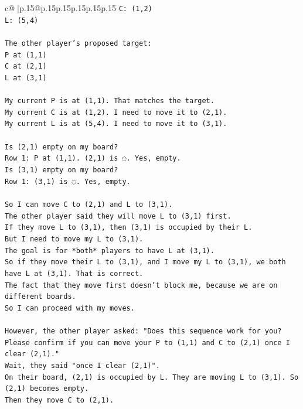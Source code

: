 \documentclass{article}
\begin{document}
{\begin{supertabular}{c@{$\;$}|p{.15\linewidth}@{}p{.15\linewidth}p{.15\linewidth}p{.15\linewidth}p{.15\linewidth}p{.15\linewidth}}
{{{\texttt{C: (1,2)} \\
\texttt{L: (5,4)} \\
\\ 
\texttt{The other player's proposed target:} \\
\texttt{P at (1,1)} \\
\texttt{C at (2,1)} \\
\texttt{L at (3,1)} \\
\\ 
\texttt{My current P is at (1,1). That matches the target.} \\
\texttt{My current C is at (1,2). I need to move it to (2,1).} \\
\texttt{My current L is at (5,4). I need to move it to (3,1).} \\
\\ 
\texttt{Is (2,1) empty on my board?} \\
\texttt{Row 1: P at (1,1). (2,1) is ◌. Yes, empty.} \\
\texttt{Is (3,1) empty on my board?} \\
\texttt{Row 1: (3,1) is ◌. Yes, empty.} \\
\\ 
\texttt{So I can move C to (2,1) and L to (3,1).} \\
\texttt{The other player said they will move L to (3,1) first.} \\
\texttt{If they move L to (3,1), then (3,1) is occupied by their L.} \\
\texttt{But I need to move my L to (3,1).} \\
\texttt{The goal is for *both* players to have L at (3,1).} \\
\texttt{So if they move their L to (3,1), and I move my L to (3,1), we both have L at (3,1). That is correct.} \\
\texttt{The fact that they move first doesn't block me, because we are on different boards.} \\
\texttt{So I can proceed with my moves.} \\
\\ 
\texttt{However, the other player asked: "Does this sequence work for you? Please confirm if you can move your P to (1,1) and C to (2,1) once I clear (2,1)."} \\
\texttt{Wait, they said "once I clear (2,1)".} \\
\texttt{On their board, (2,1) is occupied by L. They are moving L to (3,1). So (2,1) becomes empty.} \\
\texttt{Then they move C to (2,1).} \\
}}}
\end{supertabular}}
\end{document}
